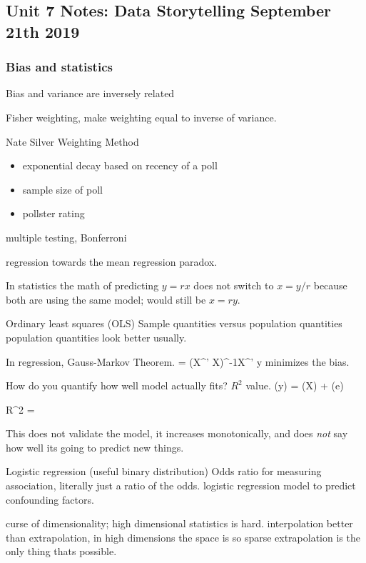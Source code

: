 \subsection{Unit 7 Notes: Data Storytelling September 21th 2019}

\subsubsection{Bias and statistics}

Bias and variance are inversely related

Fisher weighting, make weighting
equal to inverse of variance.

Nate Silver Weighting Method
\begin{itemize}
\item exponential decay based on recency of a poll
\item sample size of poll
\item pollster rating
\end{itemize}

multiple testing, Bonferroni

regression towards the mean
regression paradox.

In statistics the math of predicting
$y = rx$ does not switch to $x = y/r$ because
both are using the same model; would still
be $x = ry$.

Ordinary least squares (OLS)
Sample quantities versus population quantities
population quantities look better usually.

In regression, Gauss-Markov Theorem.
\beq
\beta = (X^' X)^{-1}X^' y
\eeq
minimizes the bias.

How do you quantify how well
model actually fits? $R^2$ value.
\beq
{}(y) = (X\hat{\beta}) + (e)
\eeq

\beq
R^2 = 
\eeq

This does not validate the model,
it increases monotonically, and
does \textit{not} say how well its
going to predict new things.

Logistic regression (useful binary distribution)
Odds ratio for measuring association, literally
just a ratio of the odds.
logistic regression model to predict confounding factors.

curse of dimensionality; high dimensional statistics
is hard. interpolation better than extrapolation,
in high dimensions the space is so sparse
extrapolation is the only thing thats possible.

